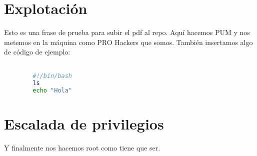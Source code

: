 \documentclass[a4paper]{article} %
\begin{document}
	\section{Explotación}
	Esto es una frase de prueba para subir el pdf al repo.
	Aquí hacemos PUM y nos metemos en la máquina como PRO Hackers que somos. También insertamos algo de código de ejemplo: 
	
	\begin{lstlisting}[language=Bash, caption=Código de ejemplo]

		#!/bin/bash
		ls
		echo "Hola"
	\end{lstlisting}
	
	
	
	\section{Escalada de privilegios}
	Y finalmente nos hacemos root como tiene que ser. 
	
	
\end{document}
